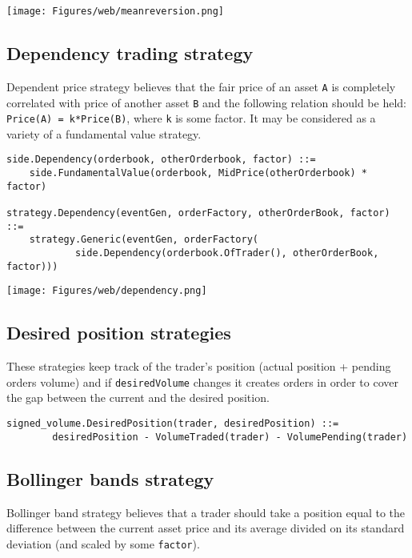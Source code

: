 \documentclass[a4paper,11pt]{article}
\begin{document}
\centerline{\texttt{[image: Figures/web/meanreversion.png]}}

\subsection{Dependency trading
strategy}\label{dependency-trading-strategy}

Dependent price strategy believes that the fair price of an asset
\texttt{A} is completely correlated with price of another asset
\texttt{B} and the following relation should be held:
\texttt{Price(A) = k*Price(B)}, where \texttt{k} is some factor. It may
be considered as a variety of a fundamental value strategy.

\begin{verbatim}
side.Dependency(orderbook, otherOrderbook, factor) ::=
    side.FundamentalValue(orderbook, MidPrice(otherOrderbook) * factor)

strategy.Dependency(eventGen, orderFactory, otherOrderBook, factor) ::=
    strategy.Generic(eventGen, orderFactory(
            side.Dependency(orderbook.OfTrader(), otherOrderBook, factor)))
\end{verbatim}

\centerline{\texttt{[image: Figures/web/dependency.png]}}

\subsection{Desired position
strategies}\label{desired-position-strategies}

These strategies keep track of the trader's position (actual position +
pending orders volume) and if \texttt{desiredVolume} changes it creates
orders in order to cover the gap between the current and the desired
position.

\begin{verbatim}
signed_volume.DesiredPosition(trader, desiredPosition) ::=
        desiredPosition - VolumeTraded(trader) - VolumePending(trader)
\end{verbatim}

\subsection{Bollinger bands strategy}\label{bollinger-bands-strategy}

Bollinger band strategy believes that a trader should take a position
equal to the difference between the current asset price and its average
divided on its standard deviation (and scaled by some \texttt{factor}).
\end{document}
